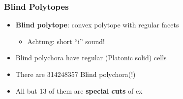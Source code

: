 \documentclass{beamer}
\begin{document}
\begin{frame}
  \frametitle{Blind Polytopes}
  \begin{itemize}
  \item
    \textbf{Blind polytope}: convex polytope with regular facets
    \begin{itemize}
    \item
      Achtung: short ``i'' sound!
    \end{itemize}
  \item
    Blind polychora have regular (Platonic solid) cells
  \item
    There are 314248357 Blind polychora(!)
  \item
    All but 13 of them are \textbf{special cuts} of ex
  \end{itemize}
\end{frame}
\end{document}
